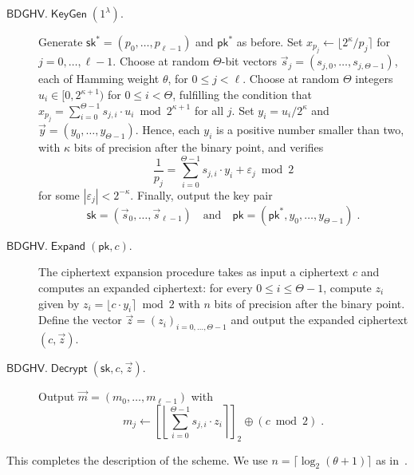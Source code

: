 \documentclass[11pt]{llncs}
\renewcommand\leq\leqslant
\newcommand{\abs}[1]{\left|#1\right|}
\DeclareMathOperator{\KeyGen}{\ensuremath{\mathsf{KeyGen}}}
\DeclareMathOperator{\Expand}{\ensuremath{\mathsf{Expand}}}
\DeclareMathOperator{\Decrypt}{\ensuremath{\mathsf{Decrypt}}}
\newcommand*{\pk}{\ensuremath{\mathsf{pk}}}
\newcommand*{\sk}{\ensuremath{\mathsf{sk}}}
\newcommand*{\BDGHV}{\ensuremath{\mathsf{BDGHV}}}
\newcommand\ignore[1]{}
\begin{document}
\begin{description}
\item[$\BDGHV.\KeyGen(1^\lambda)$.] Generate
  $\sk^*=(p_0,\ldots,p_{\ell-1})$ and $\pk^*$ as before. Set $x_{p_j}
  \leftarrow \lfloor 2^\kappa/p_j\rceil$ for
  $j=0,\ldots,{\ell-1}$. Choose at random 
  $\Theta$-bit vectors $\vec s_j=(s_{j,0},\ldots,s_{j,\Theta-1})$,
  each of Hamming weight $\theta$, for $0 \leq j < \ell$.
Choose at random $\Theta$ integers $u_i\in[0, 2^{\kappa+1})$ for $0
  \leq i <\Theta$, fulfilling the condition that
$
x_{p_j}=\sum_{i=0}^{\Theta-1}
s_{j,i} \cdot u_{i} \bmod 2^{\kappa+1}$ for all $j$.
Set $y_i=u_i/2^\kappa$ and $\vec y=(y_0,\ldots,y_{\Theta-1})$. Hence,
each $y_i$ is a positive number smaller than two, with $\kappa$ bits
of precision after the binary point, and verifies 
\begin{equation}
\label{eqpj}
\frac{1}{p_j}=\sum_{i=0}^{\Theta-1}
s_{j,i} \cdot y_{i} + \varepsilon_j \bmod 2
\end{equation}
for some $\abs{\varepsilon_j}<2^{-\kappa}$. Finally, output the key pair
$$\sk=(\vec s_0,\ldots,\vec s_{\ell-1}) \quad \text{and} \quad \pk = (\pk^*, y_0, \ldots, y_{\Theta-1})\;.$$
\item[$\BDGHV.\Expand(\pk, c)$.] The ciphertext expansion procedure takes
  as input a ciphertext $c$ and computes an expanded
  ciphertext: for every $0\leq i\leq \Theta-1$, compute $z_i$ given by
$ z_i = \lfloor c\cdot y_i\rceil \bmod 2 $
with $n$ bits of precision after the binary point. Define the vector $\vec z=(z_i)_{i=0,\ldots,\Theta-1}$ and output the expanded ciphertext $(c, \vec z)$.
\\\vspace{-0.25cm}
\item[$\BDGHV.\Decrypt(\sk, c, \vec z)$.] Output $\vec
  m=(m_0,\ldots,m_{\ell-1})$ with 
\begin{equation}
\label{eq:decrypt}
m_j \leftarrow\left[\left\lfloor\sum_{i=0}^{\Theta-1}
s_{j,i} \cdot z_{i}\right\rceil\right]_2 \oplus
(c \bmod 2)\;. 
\end{equation}
\end{description}
This completes the description of the scheme. 
We
use $n=\lceil \log_2 (\theta+1) \rceil$ as in~\cite{CMNT2011}.\ignore{; the
proof of the following Lemma is  the same as in~\cite[Appendix~E]{CMNT2011}.

\begin{lemma}The BDGHV encryption scheme is correct for the set $C(\mathcal {P_E})$ of
  circuits that compute permitted polynomials.\end{lemma} 

\begin{remark}
To reduce the size of the public key we can generate all the $y_i$'s
pseudo-randomly as in~\cite{CMNT2011},  
except $\ell$ of them in order to satisfy Equation~\eqref{eqpj} for
all $0 \leq j < \ell$.
\end{remark}
}
\end{document}
